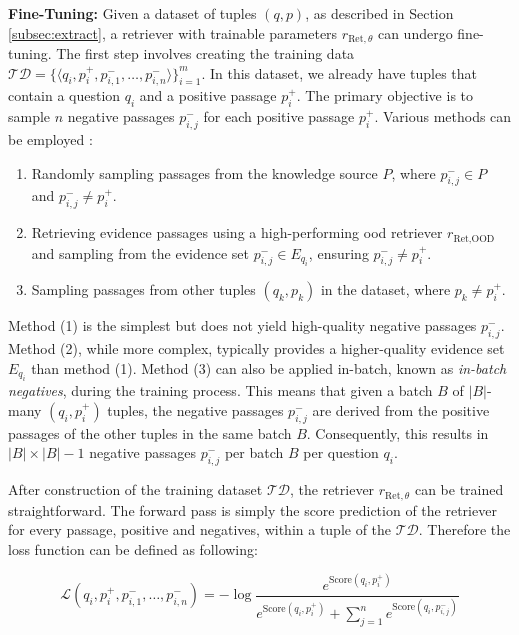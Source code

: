 \vspace{\baselineskip}

\textbf{Fine-Tuning:} Given a dataset of tuples $(q, p)$, as described in Section \ref{subsec:extract}, a retriever with trainable parameters $r_{\text{Ret}, \theta}$ can undergo fine-tuning. The first step involves creating the training data $\mathcal{TD} = \{\langle q_i, p_i^+, p_{i,1}^-, \dots, p_{i,n}^-\rangle\}_{i=1}^m$. In this dataset, we already have tuples that contain a question $q_i$ and a positive passage $p_i^+$. The primary objective is to sample $n$ negative passages $p_{i,j}^-$ for each positive passage $p_i^+$. Various methods can be employed \cite{karpukhin_dense_2020}:

\begin{enumerate}
    \item Randomly sampling passages from the knowledge source $P$, where $p_{i,j}^- \in P$ and $p_{i,j}^- \neq p_i^+$.
    \item Retrieving evidence passages using a high-performing \gls{ood} retriever $r_{\text{Ret},\text{OOD}}$ and sampling from the evidence set $p_{i,j}^- \in E_{q_i}$, ensuring $p_{i,j}^- \neq p_i^+$.
    \item Sampling passages from other tuples $(q_k,p_k)$ in the dataset, where $p_k \neq p_i^+$.
\end{enumerate}

Method (1) is the simplest but does not yield high-quality negative passages $p_{i,j}^-$. Method (2), while more complex, typically provides a higher-quality evidence set $E_{q_i}$ than method (1). Method (3) can also be applied in-batch, known as \textit{in-batch negatives}, during the training process. This means that given a batch $B$ of $|B|$-many $(q_i,p_i^+)$ tuples, the negative passages $p_{i,j}^-$ are derived from the positive passages of the other tuples in the same batch $B$. Consequently, this results in $|B| \times |B| - 1$ negative passages $p_{i,j}^-$ per batch $B$ per question $q_i$.

After construction of the training dataset $\mathcal{TD}$, the retriever $r_{\text{Ret}, \theta}$ can be trained straightforward. The forward pass is simply the score prediction of the retriever for every passage, positive and negatives, within a tuple of the $\mathcal{TD}$. Therefore the loss function can be defined as following:

\begin{equation}
    \mathcal{L}(q_i, p_i^+,p_{i,1}^-, \dots, p_{i,n}^-) = -\log \frac{e^{\text{Score}(q_i,p_i^+)}}{e^{\text{Score}(q_i,p_i^+)} + \sum_{j=1}^{n} e^{\text{Score}(q_i,p_{i,j}^-)}}
\end{equation}

